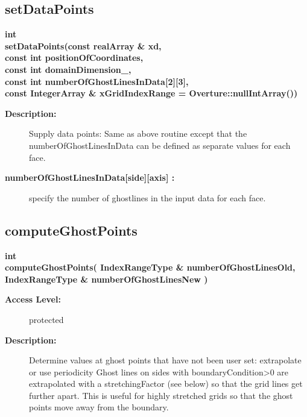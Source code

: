 \subsection{setDataPoints}
 
\begin{flushleft} \textbf{%
int  \\ 
\settowidth{\DataPointMappingIncludeArgIndent}{setDataPoints(}%
setDataPoints(const realArray \& xd, \\ 
\hspace{\DataPointMappingIncludeArgIndent}const int positionOfCoordinates, \\ 
\hspace{\DataPointMappingIncludeArgIndent}const int domainDimension\_,\\ 
\hspace{\DataPointMappingIncludeArgIndent}const int numberOfGhostLinesInData[2][3],\\ 
const IntegerArray \& xGridIndexRange  = Overture::nullIntArray())
}\end{flushleft}
\begin{description}
\item[{\bf Description:}] 
    Supply data points: Same as above routine except that the numberOfGhostLinesInData can
  be defined as separate values for each face.
\item[{\bf numberOfGhostLinesInData[side][axis] :}]  specify the number of ghostlines in the input data
    for each face.
\end{description}
\subsection{computeGhostPoints}
 
\begin{flushleft} \textbf{%
int  \\ 
\settowidth{\DataPointMappingIncludeArgIndent}{computeGhostPoints(}%
computeGhostPoints( IndexRangeType \& numberOfGhostLinesOld, \\ 
\hspace{\DataPointMappingIncludeArgIndent}IndexRangeType \& numberOfGhostLinesNew )
}\end{flushleft}
\begin{description}
\item[{\bf Access Level:}]  protected
\item[{\bf Description:}] 
   Determine values at ghost points that have not been user set:  extrapolate or use periodicity
   Ghost lines on sides with boundaryCondition>0 are extrapolated with a stretchingFactor (see below)
   so that the grid lines get
   further apart. This is useful for highly stretched grids so that the ghost points move away from
   the boundary.
\end{description}
